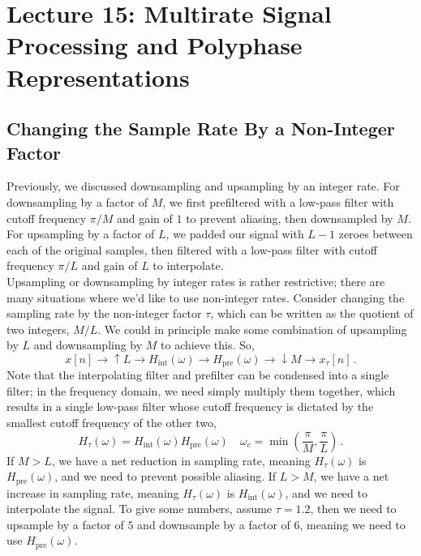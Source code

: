 \section{Lecture 15: Multirate Signal Processing and Polyphase Representations}
%
\subsection{Changing the Sample Rate By a Non-Integer Factor}
%
Previously, we discussed downsampling and upsampling by an integer rate.
For downsampling by a factor of $M$, we first prefiltered with a low-pass
filter with cutoff frequency $\pi/M$ and gain of $1$ to prevent aliasing,
then downsampled by $M$. For upsampling by a factor of $L$, we padded our
signal with $L-1$ zeroes between each of the original samples, then filtered
with a low-pass filter with cutoff frequency $\pi/L$ and gain of $L$
to interpolate.\\
%
Upsampling or downsampling by integer rates is rather restrictive; there are
many situations where we'd like to use non-integer rates. Consider changing
the sampling rate by the non-integer factor $\tau$, which can be written as
the quotient of two integers, $M/L$. We could in principle make some combination
of upsampling by $L$ and downsampling by $M$ to achieve this. So,
%
\begin{displaymath}
  x[n] \longrightarrow \boxed{\uparrow L}
  \longrightarrow \boxed{H_\mathrm{int}(\omega)}
  \longrightarrow \boxed{H_\mathrm{pre}(\omega)}
  \longrightarrow \boxed{\downarrow M}
  \longrightarrow x_\tau[n] \,.
\end{displaymath}
%
Note that the interpolating filter and prefilter can be condensed into a single
filter; in the frequency domain, we need simply multiply them together, which
results in a single low-pass filter whose cutoff frequency is dictated by
the smallest cutoff frequency of the other two,
%
\begin{displaymath}
  H_\tau(\omega) = H_\mathrm{int}(\omega)H_\mathrm{pre}(\omega)
  \quad \omega_c = \min\left(\frac{\pi}{M},\frac{\pi}{L}\right) \,.
\end{displaymath}
%
If $M>L$, we have a net reduction in sampling rate, meaning $H_\tau(\omega)$
is $H_\mathrm{pre}(\omega)$, and we need to prevent possible aliasing. If
$L>M$, we have a net increase in sampling rate, meaning $H_\tau(\omega)$ is
$H_\mathrm{int}(\omega)$, and we need to interpolate the signal. To give some
numbers, assume $\tau = 1.2$, then we need to upsample by a factor of $5$
and downsample by a factor of $6$, meaning we need to use
$H_\mathrm{pre}(\omega)$.

